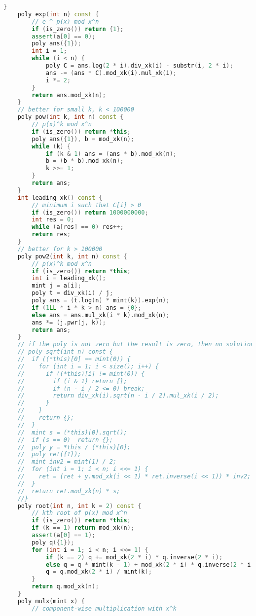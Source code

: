 \documentclass[10pt, a4paper, oneside]{book}
\begin{document}
\begin{lstlisting}[language=C++]
    }
    poly exp(int n) const {
        // e ^ p(x) mod x^n
        if (is_zero()) return {1};
        assert(a[0] == 0);
        poly ans({1});
        int i = 1;
        while (i < n) {
            poly C = ans.log(2 * i).div_xk(i) - substr(i, 2 * i);
            ans -= (ans * C).mod_xk(i).mul_xk(i);
            i *= 2;
        }
        return ans.mod_xk(n);
    }
    // better for small k, k < 100000
    poly pow(int k, int n) const {
        // p(x)^k mod x^n
        if (is_zero()) return *this;
        poly ans({1}), b = mod_xk(n);
        while (k) {
            if (k & 1) ans = (ans * b).mod_xk(n);
            b = (b * b).mod_xk(n);
            k >>= 1;
        }
        return ans;
    }
    int leading_xk() const {
        // minimum i such that C[i] > 0
        if (is_zero()) return 1000000000;
        int res = 0;
        while (a[res] == 0) res++;
        return res;
    }
    // better for k > 100000
    poly pow2(int k, int n) const {
        // p(x)^k mod x^n
        if (is_zero()) return *this;
        int i = leading_xk();
        mint j = a[i];
        poly t = div_xk(i) / j;
        poly ans = (t.log(n) * mint(k)).exp(n);
        if (1LL * i * k > n) ans = {0};
        else ans = ans.mul_xk(i * k).mod_xk(n);
        ans *= (j.pwr(j, k));
        return ans;
    }
    // if the poly is not zero but the result is zero, then no solution
    // poly sqrt(int n) const {
    //  if ((*this)[0] == mint(0)) {
    //    for (int i = 1; i < size(); i++) {
    //      if ((*this)[i] != mint(0)) {
    //        if (i & 1) return {};
    //        if (n - i / 2 <= 0) break;
    //        return div_xk(i).sqrt(n - i / 2).mul_xk(i / 2);
    //      }
    //    }
    //    return {};
    //  }
    //  mint s = (*this)[0].sqrt();
    //  if (s == 0)  return {};
    //  poly y = *this / (*this)[0];
    //  poly ret({1});
    //  mint inv2 = mint(1) / 2;
    //  for (int i = 1; i < n; i <<= 1) {
    //    ret = (ret + y.mod_xk(i << 1) * ret.inverse(i << 1)) * inv2;
    //  }
    //  return ret.mod_xk(n) * s;
    //}
    poly root(int n, int k = 2) const {
        // kth root of p(x) mod x^n
        if (is_zero()) return *this;
        if (k == 1) return mod_xk(n);
        assert(a[0] == 1);
        poly q({1});
        for (int i = 1; i < n; i <<= 1) {
            if (k == 2) q += mod_xk(2 * i) * q.inverse(2 * i);
            else q = q * mint(k - 1) + mod_xk(2 * i) * q.inverse(2 * i).pow(k - 1, 2 * i);
            q = q.mod_xk(2 * i) / mint(k);
        }
        return q.mod_xk(n);
    }
    poly mulx(mint x) {
        // component-wise multiplication with x^k

\end{lstlisting}
\end{document}
